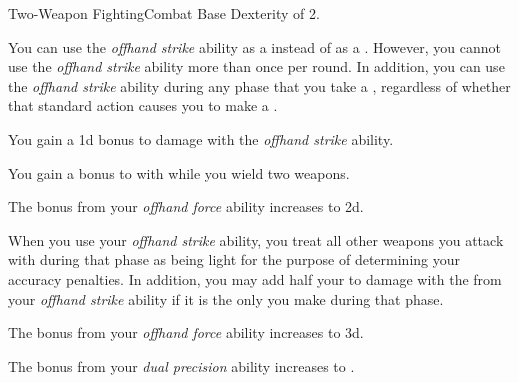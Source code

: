     \begin{feat}{Two-Weapon Fighting}{Combat}
        \featpre Base Dexterity of 2.

         You can use the \textit{offhand strike} ability as a  instead of as a .
        However, you cannot use the \textit{offhand strike} ability more than once per round.
        In addition, you can use the \textit{offhand strike} ability during any phase that you take a , regardless of whether that standard action causes you to make a .

         You gain a \plus1d bonus to damage with the \textit{offhand strike} ability.

         You gain a  bonus to  with  while you wield two weapons.

         The bonus from your \textit{offhand force} ability increases to \plus2d.

         When you use your \textit{offhand strike} ability, you treat all other weapons you attack with during that phase as being light for the purpose of determining your accuracy penalties.
        In addition, you may add half your  to damage with the  from your \textit{offhand strike} ability if it is the only  you make during that phase.

         The bonus from your \textit{offhand force} ability increases to \plus3d.

         The bonus from your \textit{dual precision} ability increases to .
    \end{feat}

